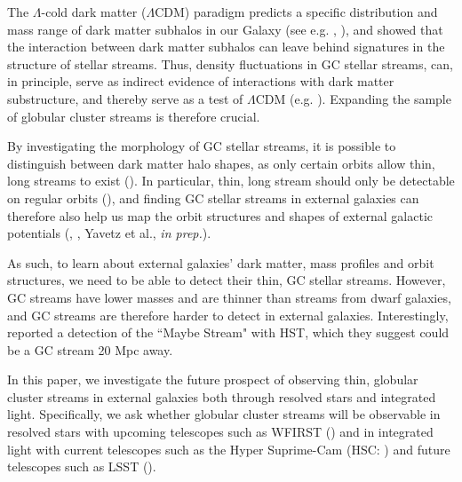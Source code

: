 \documentclass[twocolumn]{aastex62}
\begin{document}
The $\Lambda$-cold dark matter ($\Lambda$CDM) paradigm predicts a specific distribution and mass range of dark matter subhalos in our Galaxy (see e.g. \citealt{bovy17}, \citealt{bonaca19}), and \citet{ibata02} showed that the interaction between dark matter subhalos can leave behind signatures in the structure of stellar streams. Thus, density fluctuations in GC stellar streams, can, in principle, serve as indirect evidence of interactions with dark matter substructure, and thereby serve as a test of $\Lambda$CDM (e.g. \citealt{yoon11}). Expanding the sample of globular cluster streams is therefore crucial. 

By investigating the morphology of GC stellar streams, it is  possible to distinguish between dark matter halo shapes, as only certain orbits allow thin, long streams to exist (\citealt{pearson15}). In particular, thin, long stream should only be detectable on regular orbits (\citealt{price16}), and finding GC stellar streams in external galaxies can therefore also help us map the orbit structures and shapes of external galactic potentials (\citealt{pearson15}, \citealt{price16}, Yavetz et al., {\it in prep.}).

As such, to learn about external galaxies' dark matter, mass profiles and orbit structures, we need to be able to detect their thin, GC stellar streams. However, GC streams have lower masses and are thinner than streams from dwarf galaxies, and GC streams are therefore harder to detect in external galaxies. Interestingly, \citet{abraham18} reported a detection of the ``Maybe Stream" with HST, which they suggest could be a GC stream 20 Mpc away. 


In this paper, we investigate the future prospect of observing thin, globular cluster streams in external galaxies both through resolved stars and integrated light. 
Specifically, we ask whether globular cluster streams will be observable in resolved stars with upcoming telescopes such as WFIRST (\citealt{spergel13}) and in integrated light with current telescopes such as the Hyper Suprime-Cam (HSC: \citealt{miyazaki12}) and future telescopes such as LSST (\citealt{ivezi08}). %
\end{document}
